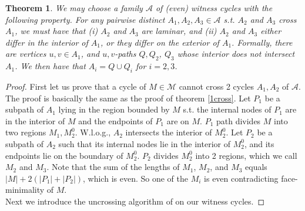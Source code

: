 \documentclass[letterpaper,11pt]{article}
\newtheorem{theorem}{Theorem}[section]
\newcommand{\0}{\mathbb{0}}
\newcommand{\1}{\mathbb{1}}
\begin{document}
\begin{theorem} \label{laminar witness}
We may choose a family $\mathcal{A}$ of (even) witness cycles with the following property.
For any pairwise distinct $A_1, A_2, A_3 \in \mathcal{A}$ s.t. $A_2$ and $A_3$ cross $A_1$, we must have that (i) $A_2$ and $A_3$ are laminar, and (ii) $A_2$ and $A_3$ either differ in the interior of $A_1$, or they differ on the exterior of $A_1$.
Formally, there are vertices $u,v \in A_1$, and $u,v$-paths $Q,Q_2$, $Q_3$ whose interior does not intersect $A_1$. We then have that $A_i = Q \cup Q_i$ for $i=2,3$.
\end{theorem} 

\begin{proof}
First let us prove that a cycle of $M \in \mathcal{M} $ cannot cross 2 cycles $A_1 , A_2$ of $\mathcal{A}  $. The proof is basically the same as the proof of theorem \ref{1cross}. Let $P_1$ 
be a subpath of $A_1$ 
lying in the region bounded by $M$ s.t. the internal nodes of $P_1$ are in the interior of $M$ and the endpoints of $P_1$ are on $M$. $P_1$ path divides $M$ into two regions $M_1, M^0_2 $. W.l.o.g.,  $A_2$ intersects the interior of $M^0_2$. Let $P_2$ be a subpath of $A_2$ such that its internal nodes lie in the interior of $M^0_2$, and its endpoints lie on the boundary of $M^0_2$.  $P_2$ divides $M^0_2$ into 2 regions, which we call $M_2$ and $M_3$. Note that the sum of the lengths of $M_1$, $M_2$, and $M_3$ equals $|M| +2(|P_1|+|P_2|)$, which is even. So one of the $M_i$ is even contradicting face-minimality of $M$.\\
%
Next we introduce the uncrossing algorithm of \cite{GW98} on our witness cycles. %

\end{proof}
\end{document}
